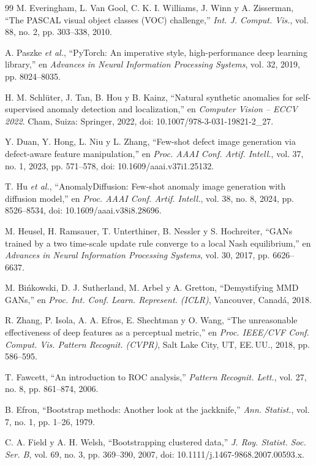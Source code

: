 \documentclass[12pt,oneside]{report}
\begin{document}
\begin{thebibliography}{99}
 M. Everingham, L. Van Gool, C. K. I. Williams, J. Winn y A. Zisserman, ``The PASCAL visual object classes (VOC) challenge,'' \textit{Int. J. Comput. Vis.}, vol. 88, no. 2, pp. 303--338, 2010.

 A. Paszke \textit{et al.}, ``PyTorch: An imperative style, high-performance deep learning library,'' en \textit{Advances in Neural Information Processing Systems}, vol. 32, 2019, pp. 8024--8035.

 H. M. Schlüter, J. Tan, B. Hou y B. Kainz, ``Natural synthetic anomalies for self-supervised anomaly detection and localization,'' en \textit{Computer Vision -- ECCV 2022}. Cham, Suiza: Springer, 2022, doi: 10.1007/978-3-031-19821-2\_27.

 Y. Duan, Y. Hong, L. Niu y L. Zhang, ``Few-shot defect image generation via defect-aware feature manipulation,'' en \textit{Proc. AAAI Conf. Artif. Intell.}, vol. 37, no. 1, 2023, pp. 571--578, doi: 10.1609/aaai.v37i1.25132.

 T. Hu \textit{et al.}, ``AnomalyDiffusion: Few-shot anomaly image generation with diffusion model,'' en \textit{Proc. AAAI Conf. Artif. Intell.}, vol. 38, no. 8, 2024, pp. 8526--8534, doi: 10.1609/aaai.v38i8.28696.

 M. Heusel, H. Ramsauer, T. Unterthiner, B. Nessler y S. Hochreiter, ``GANs trained by a two time-scale update rule converge to a local Nash equilibrium,'' en \textit{Advances in Neural Information Processing Systems}, vol. 30, 2017, pp. 6626--6637.

 M. Bi\'{n}kowski, D. J. Sutherland, M. Arbel y A. Gretton, ``Demystifying MMD GANs,'' en \textit{Proc. Int. Conf. Learn. Represent. (ICLR)}, Vancouver, Canadá, 2018.

 R. Zhang, P. Isola, A. A. Efros, E. Shechtman y O. Wang, ``The unreasonable effectiveness of deep features as a perceptual metric,'' en \textit{Proc. IEEE/CVF Conf. Comput. Vis. Pattern Recognit. (CVPR)}, Salt Lake City, UT, EE.\,UU., 2018, pp. 586--595.

 T. Fawcett, ``An introduction to ROC analysis,'' \textit{Pattern Recognit. Lett.}, vol. 27, no. 8, pp. 861--874, 2006.

 B. Efron, ``Bootstrap methods: Another look at the jackknife,'' \textit{Ann. Statist.}, vol. 7, no. 1, pp. 1--26, 1979.

 C. A. Field y A. H. Welsh, ``Bootstrapping clustered data,'' \textit{J. Roy. Statist. Soc. Ser. B}, vol. 69, no. 3, pp. 369--390, 2007, doi: 10.1111/j.1467-9868.2007.00593.x.


\end{thebibliography}
\end{document}
